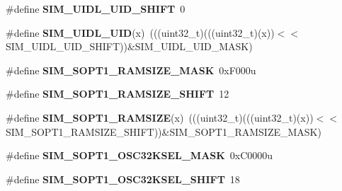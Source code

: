 \begin{DoxyCompactItemize}
\item 
\#define {\bfseries S\+I\+M\+\_\+\+U\+I\+D\+L\+\_\+\+U\+I\+D\+\_\+\+S\+H\+I\+FT}~0\hypertarget{group__SIM__Register__Masks_ga6fb1383717ebfa6f47b5a5952fd21d63}{}\label{group__SIM__Register__Masks_ga6fb1383717ebfa6f47b5a5952fd21d63}

\item 
\#define {\bfseries S\+I\+M\+\_\+\+U\+I\+D\+L\+\_\+\+U\+ID}(x)~(((uint32\+\_\+t)(((uint32\+\_\+t)(x))$<$$<$S\+I\+M\+\_\+\+U\+I\+D\+L\+\_\+\+U\+I\+D\+\_\+\+S\+H\+I\+FT))\&S\+I\+M\+\_\+\+U\+I\+D\+L\+\_\+\+U\+I\+D\+\_\+\+M\+A\+SK)\hypertarget{group__SIM__Register__Masks_ga636c37811a4a8c9a57df79fd1790b800}{}\label{group__SIM__Register__Masks_ga636c37811a4a8c9a57df79fd1790b800}

\item 
\#define {\bfseries S\+I\+M\+\_\+\+S\+O\+P\+T1\+\_\+\+R\+A\+M\+S\+I\+Z\+E\+\_\+\+M\+A\+SK}~0x\+F000u\hypertarget{group__SIM__Register__Masks_ga9fbcfd0b3e4fb08ee733dee975a5df29}{}\label{group__SIM__Register__Masks_ga9fbcfd0b3e4fb08ee733dee975a5df29}

\item 
\#define {\bfseries S\+I\+M\+\_\+\+S\+O\+P\+T1\+\_\+\+R\+A\+M\+S\+I\+Z\+E\+\_\+\+S\+H\+I\+FT}~12\hypertarget{group__SIM__Register__Masks_ga4100f9e8e8ffc766ac1ac6493379b8dc}{}\label{group__SIM__Register__Masks_ga4100f9e8e8ffc766ac1ac6493379b8dc}

\item 
\#define {\bfseries S\+I\+M\+\_\+\+S\+O\+P\+T1\+\_\+\+R\+A\+M\+S\+I\+ZE}(x)~(((uint32\+\_\+t)(((uint32\+\_\+t)(x))$<$$<$S\+I\+M\+\_\+\+S\+O\+P\+T1\+\_\+\+R\+A\+M\+S\+I\+Z\+E\+\_\+\+S\+H\+I\+FT))\&S\+I\+M\+\_\+\+S\+O\+P\+T1\+\_\+\+R\+A\+M\+S\+I\+Z\+E\+\_\+\+M\+A\+SK)\hypertarget{group__SIM__Register__Masks_ga4cd929a0204fbf30ba60cc0899ad039d}{}\label{group__SIM__Register__Masks_ga4cd929a0204fbf30ba60cc0899ad039d}

\item 
\#define {\bfseries S\+I\+M\+\_\+\+S\+O\+P\+T1\+\_\+\+O\+S\+C32\+K\+S\+E\+L\+\_\+\+M\+A\+SK}~0x\+C0000u\hypertarget{group__SIM__Register__Masks_ga5c660cd4a6d8062e6ef4afbc17c27fa4}{}\label{group__SIM__Register__Masks_ga5c660cd4a6d8062e6ef4afbc17c27fa4}

\item 
\#define {\bfseries S\+I\+M\+\_\+\+S\+O\+P\+T1\+\_\+\+O\+S\+C32\+K\+S\+E\+L\+\_\+\+S\+H\+I\+FT}~18\hypertarget{group__SIM__Register__Masks_gac9e930c4ee375a2aee6fa6c97e061226}{}\label{group__SIM__Register__Masks_gac9e930c4ee375a2aee6fa6c97e061226}


\end{DoxyCompactItemize}
